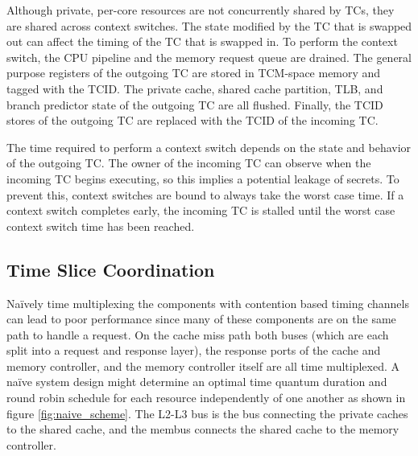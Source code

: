 Although private, per-core resources are not concurrently shared by TCs, they 
are shared across context switches. The state modified by the TC that is 
swapped out can affect the timing of the TC that is swapped in.
To perform the context switch, the CPU pipeline and the memory request queue 
are drained. The general purpose registers of the outgoing TC are stored in 
TCM-space memory and tagged with the TCID. The private cache, shared cache 
partition, TLB, and branch predictor state of the outgoing TC are all flushed.  
Finally, the TCID stores of the outgoing TC are replaced with the TCID of the 
incoming TC. 

The time required to perform a context switch depends on the state and behavior 
of the outgoing TC. The owner of the incoming TC can observe when the incoming 
TC begins executing, so this implies a potential leakage of secrets.  To 
prevent this, context switches are bound to always take the worst case time.  
If a context switch completes early, the incoming TC is stalled until the worst 
case context switch time has been reached.

\subsection{Time Slice Coordination}
\label{sec:coordination}
Naïvely time multiplexing the components with contention based timing channels 
can lead to poor performance since many of these components are on the same 
path to handle a request. 
On the cache miss path both buses (which are each split into a request and 
response layer), the response ports of the cache and memory controller, and the 
memory controller itself are all time multiplexed. A naïve system design might 
determine an optimal time quantum duration and round robin schedule for each 
resource independently of one another as shown in figure 
\ref{fig:naive_scheme}. The L2-L3 bus is the bus connecting the private caches 
to the shared cache, and the membus connects the shared cache to the memory 
controller.

